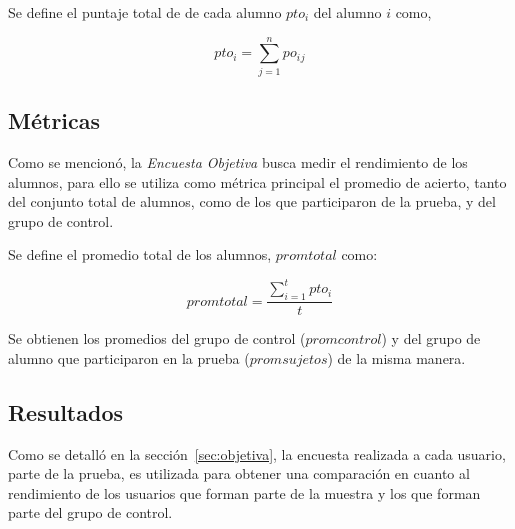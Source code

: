 Se define el puntaje total de de cada alumno $pto_i$ del alumno $i$ como, 

\begin{equation*}
    pto_i = \sum_{j=1}^n{po_i{_j}}
\end{equation*}


\subsection{Métricas}

Como se mencionó, la \emph{Encuesta Objetiva} busca medir el rendimiento de los 
alumnos, para ello se utiliza como métrica principal el promedio de acierto, 
tanto del conjunto total de alumnos, como de los que participaron de la
prueba, y del grupo de control.

Se define el promedio total de los alumnos, $promtotal$ como:

\begin{equation*}
    promtotal = \frac{\sum_{i=1}^t{pto_i}}{t}
\end{equation*}

Se obtienen los promedios del grupo de control ($promcontrol$) y del grupo de alumno que
participaron en la prueba ($promsujetos$) de la misma manera.

\subsection{Resultados}
\label{sec:res_objetiva}

Como se detalló en la sección~\ref{sec:objetiva}, la encuesta realizada a cada
usuario, parte de la prueba, es utilizada para obtener una comparación en cuanto
al rendimiento de los usuarios que forman parte de la muestra y los que forman
parte del grupo de control.


